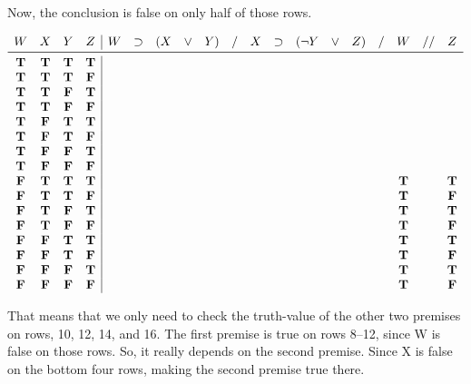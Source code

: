 \documentclass[../logic-text.tex]{subfiles}
\begin{document}
Now, the conclusion is false on only half of those rows.

\[
  \begin{array}{cccc|cccccccccccccccc}
    W & X & Y & Z & W & \lif & (X & \lor&  Y)&  /&  X&  \lif&  (\lneg Y &  \lor &  Z) & / & W & // & Z \\ \midrule
    \true & \true & \true & \true &&&&&&&&&&&&&&& \\
    \true & \true & \true & \false &&&&&&&&&&&&&&& \\
    \true & \true & \false & \true &&&&&&&&&&&&&&& \\
    \true & \true & \false & \false &&&&&&&&&&&&&&& \\
    \true & \false & \true & \true &&&&&&&&&&&&&&& \\
    \true & \false & \true & \false &&&&&&&&&&&&&&& \\
    \true & \false & \false & \true &&&&&&&&&&&&&&& \\
    \true & \false & \false & \false &&&&&&&&&&&&&&& \\
    \false & \true & \true & \true &&&&&&&&&&&&& \true && \true \\
    \false & \true & \true & \false &&&&&&&&&&&&& \true && \false \\
    \false & \true & \false & \true &&&&&&&&&&&&& \true && \true \\
    \false & \true & \false & \false &&&&&&&&&&&&& \true && \false \\
    \false & \false & \true & \true &&&&&&&&&&&&& \true && \true \\
    \false & \false & \true & \false &&&&&&&&&&&&& \true && \false \\
    \false & \false & \false & \true &&&&&&&&&&&&& \true && \true \\
    \false & \false & \false & \false &&&&&&&&&&&&& \true && \false \\
\end{array}
\]

That means that we only need to check the truth-value of the other two premises on rows, 10, 12, 14, and 16.
The first premise is true on rows 8--12, since W is false on those rows.
So, it really depends on the second premise.
Since X is false on the bottom four rows, making the second premise true there.
\end{document}
